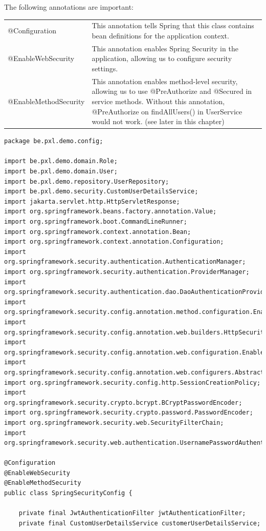 The following annotations are important:
\begin{tabular}{|l|l|}
\hline
 @Configuration &
This annotation tells Spring that this class contains bean definitions for the application context. \\
@EnableWebSecurity &
This annotation enables Spring Security in the application, allowing us to configure security settings. \\
@EnableMethodSecurity &
This annotation enables method-level security, allowing us to use @PreAuthorize and @Secured in service methods.
Without this annotation, @PreAuthorize on findAllUsers() in UserService would not work. (see later in this chapter)\\
\hline
\end{tabular}

\begin{lstlisting}
package be.pxl.demo.config;

import be.pxl.demo.domain.Role;
import be.pxl.demo.domain.User;
import be.pxl.demo.repository.UserRepository;
import be.pxl.demo.security.CustomUserDetailsService;
import jakarta.servlet.http.HttpServletResponse;
import org.springframework.beans.factory.annotation.Value;
import org.springframework.boot.CommandLineRunner;
import org.springframework.context.annotation.Bean;
import org.springframework.context.annotation.Configuration;
import org.springframework.security.authentication.AuthenticationManager;
import org.springframework.security.authentication.ProviderManager;
import org.springframework.security.authentication.dao.DaoAuthenticationProvider;
import org.springframework.security.config.annotation.method.configuration.EnableMethodSecurity;
import org.springframework.security.config.annotation.web.builders.HttpSecurity;
import org.springframework.security.config.annotation.web.configuration.EnableWebSecurity;
import org.springframework.security.config.annotation.web.configurers.AbstractHttpConfigurer;
import org.springframework.security.config.http.SessionCreationPolicy;
import org.springframework.security.crypto.bcrypt.BCryptPasswordEncoder;
import org.springframework.security.crypto.password.PasswordEncoder;
import org.springframework.security.web.SecurityFilterChain;
import org.springframework.security.web.authentication.UsernamePasswordAuthenticationFilter;

@Configuration
@EnableWebSecurity
@EnableMethodSecurity
public class SpringSecurityConfig {

    private final JwtAuthenticationFilter jwtAuthenticationFilter;
    private final CustomUserDetailsService customerUserDetailsService;


\end{lstlisting}

